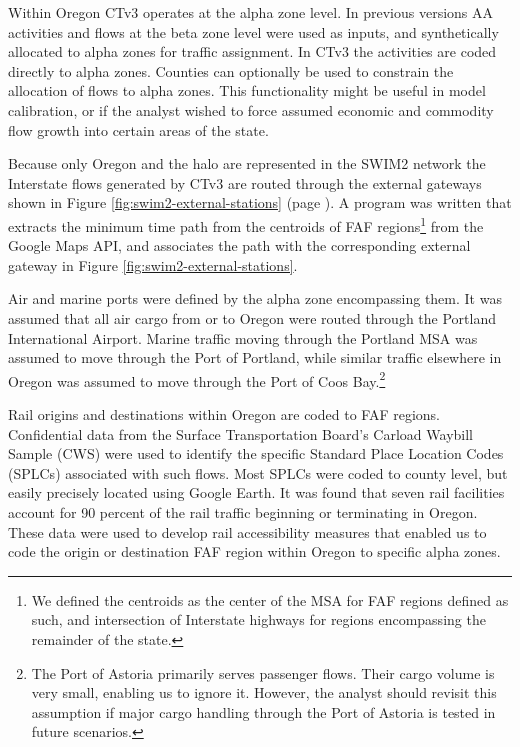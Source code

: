 Within Oregon CTv3 operates at the alpha zone level. In previous versions AA activities and flows at the beta zone level were used as inputs, and synthetically allocated to alpha zones for traffic assignment. In CTv3 the activities are coded directly to alpha zones. Counties can optionally be used to constrain the allocation of flows to alpha zones. This functionality might be useful in model calibration, or if the analyst wished to force assumed economic and commodity flow growth into certain areas of the state.

Because only Oregon and the halo are represented in the SWIM2 network the Interstate flows generated by CTv3 are routed through the external gateways shown in Figure \ref{fig:swim2-external-stations} (page \pageref{fig:swim2-external-stations}). A program was written that extracts the minimum time path from the centroids of FAF regions\footnote{We defined the centroids as the center of the MSA for FAF regions defined as such, and intersection of Interstate highways for regions encompassing the remainder of the state.} from the Google Maps API, and associates the path with the corresponding external gateway in Figure \ref{fig:swim2-external-stations}.

Air and marine ports were defined by the alpha zone encompassing them. It was assumed that all air cargo from or to Oregon were routed through the Portland International Airport. Marine traffic moving through the Portland MSA was assumed to move through the Port of Portland, while similar traffic elsewhere in Oregon was assumed to move through the Port of Coos Bay.\footnote{The Port of Astoria primarily serves passenger flows. Their cargo volume is very small, enabling us to ignore it. However, the analyst should revisit this assumption if major cargo handling through the Port of Astoria is tested in future scenarios.} 

Rail origins and destinations within Oregon are coded to FAF regions. Confidential data from the Surface Transportation Board's Carload Waybill Sample (CWS) were used to identify the specific Standard Place Location Codes (SPLCs) associated with such flows. Most SPLCs were coded to county level, but easily precisely located using Google Earth. It was found that seven rail facilities account for 90 percent of the rail traffic beginning or terminating in Oregon. These data were used to develop rail accessibility measures that enabled us to code the origin or destination FAF region within Oregon to specific alpha zones.

